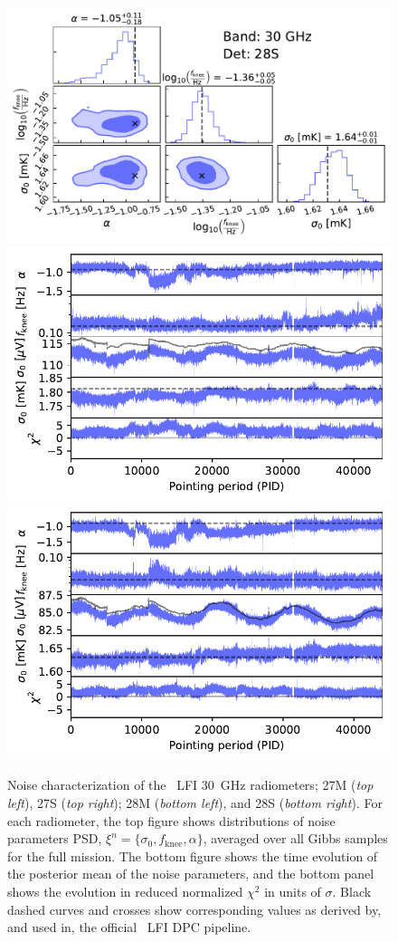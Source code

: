 \documentclass[twocolumn]{aa}
\begin{document}
\begin{figure}[p]
\begin{center}
    \includegraphics[width=0.495\linewidth]{figs/corner_band_030_det_4_mean.pdf}\\
    \includegraphics[width=0.495\linewidth]{figs/xi_vs_pid_band_030_det_3_mean.pdf}
    \includegraphics[width=0.495\linewidth]{figs/xi_vs_pid_band_030_det_4_mean.pdf}
     \vspace*{-5.5mm}    
  \end{center}
  
  \caption{Noise characterization of the \Planck\ LFI 30~GHz
    radiometers; 27M (\emph{top left}), 27S (\emph{top right}); 28M
    (\emph{bottom left}), and 28S (\emph{bottom right}). For each
    radiometer, the top figure shows distributions of noise parameters
    PSD, $\xi^n = \{\sigma_0, f_\mathrm{knee}, \alpha\}$, averaged
    over all Gibbs samples for the full mission. The bottom figure
    shows the time evolution of the posterior mean of the noise
    parameters, and the bottom panel shows the evolution in reduced
    normalized $\chi^2$ in units of $\sigma$. Black dashed curves and crosses show corresponding values as derived by, and used in, the
    official \Planck\ LFI DPC pipeline.
    \label{fig:xi_prop_30}}
\end{figure}
\end{document}
